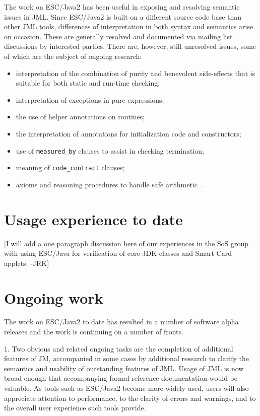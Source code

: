 \documentclass{acm_proc_article-sp}
\begin{document}
The work on ESC/Java2 has been useful in exposing and resolving
semantic issues in JML.  Since ESC/Java2 is built on a different
source code base than other JML tools, differences of interpretation
in both syntax and semantics arise on occasion.  These are generally
resolved and documented via mailing list discussions by interested
parties.  There are, however, still unresolved issues, some of which
are the subject of ongoing research:
\setlength{\partopsep}{0in}\setlength{\parskip}{0in}\setlength{\itemsep}{0in}\setlength{\topsep}{0in}
\begin{itemize}
\setlength{\partopsep}{0in}\setlength{\parskip}{0in}\setlength{\itemsep}{0in}\setlength{\topsep}{0in}
\item interpretation of the combination of purity and benevolent
  side-effects that is suitable for both static and run-time checking;
\item interpretation of exceptions in pure expressions;
\item the use of helper annotations on routines;
\item the interpretation of annotations for initialization code and
  constructors;
\item use of \texttt{measured\_by} clauses to assist in checking
  termination;
\item meaning of \texttt{code\_contract} clauses;
\item axioms and reasoning procedures to handle safe
  arithmetic~\cite{Chalin03}.
\end{itemize}

\section{Usage experience to date}
[I will add a one paragraph discussion here of our experiences in
the SoS group with using ESC/Java for verification of core JDK classes
and Smart Card applets. -JRK]

\section{Ongoing work}
The work on ESC/Java2 to date has resulted in a number of software
alpha releases and the work is continuing on a number of fronts.

1. Two obvious and related ongoing tasks are the completion of 
 additional features of JM, accompanied in some 
 cases by additional research to clarify the semantics and usability of
  outstanding features of JML.  Usage of JML is now broad enough that
  accompanying formal reference documentation would be valuable.  As tools
 such as ESC/Java2 become more widely used,
 users will also appreciate attention to performance, to
  the clarity of errors and warnings, and to the overall user experience such
 tools provide.
\end{document}

